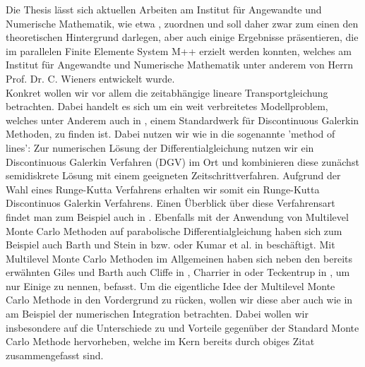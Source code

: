Die Thesis lässt sich aktuellen Arbeiten am Institut für Angewandte und Numerische Mathematik, wie etwa \cite{bibid}, zuordnen und soll daher zwar zum einen den theoretischen Hintergrund darlegen, aber auch einige Ergebnisse präsentieren, die im parallelen Finite Elemente System M++ \cite{siteM++} erzielt werden konnten, welches am Institut für Angewandte und Numerische Mathematik unter anderem von Herrn Prof. Dr. C. Wieners entwickelt wurde. \\
Konkret wollen wir vor allem die zeitabhängige lineare Transportgleichung betrachten. Dabei handelt es sich um ein weit verbreitetes Modellproblem, welches unter Anderem auch in \cite{di2011mathematical}, einem Standardwerk für Discontinuous Galerkin Methoden, zu finden ist. 
Dabei nutzen wir wie in \cite{di2011mathematical} die sogenannte 'method of lines': Zur numerischen Lösung der Differentialgleichung nutzen wir ein Discontinuous Galerkin Verfahren (DGV) im Ort und kombinieren diese zunächst semidiskrete Lösung mit einem geeigneten Zeitschrittverfahren. Aufgrund der Wahl eines Runge-Kutta Verfahrens erhalten wir somit ein Runge-Kutta Discontinuos Galerkin Verfahrens. Einen Überblick über diese Verfahrensart findet man zum Beispiel auch in \cite{cockburn2001runge}.
Ebenfalls mit der Anwendung von Multilevel Monte Carlo Methoden auf parabolische Differentialgleichung haben sich zum Beispiel auch Barth und Stein in \cite{barth2013multilevel} bzw. \cite{barth2019multilevel} oder Kumar et al. in \cite{kumar2018multigrid} beschäftigt. Mit Multilevel Monte Carlo Methoden im Allgemeinen haben sich neben den bereits erwähnten Giles und Barth auch Cliffe in \cite{cliffe2011multilevel}, Charrier in \cite{charrier2012strong} oder Teckentrup in \cite{teckentrup2013further}, um nur Einige zu nennen, befasst.
Um die eigentliche Idee der Multilevel Monte Carlo Methode in den Vordergrund zu rücken, wollen wir diese aber auch wie in \cite{heinrich2001multilevel} am Beispiel der numerischen Integration betrachten.
Dabei wollen wir insbesondere auf die Unterschiede zu und Vorteile gegenüber der Standard Monte Carlo Methode hervorheben, welche im Kern bereits durch obiges Zitat zusammengefasst sind.

